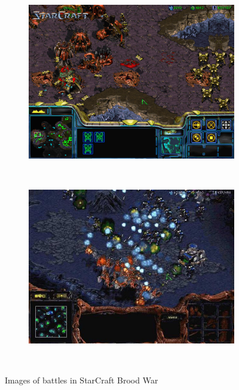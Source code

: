\begin{figure}
        \begin{subfigure}[b]{0.5\textwidth}
                \centering
                \includegraphics[width=\textwidth]{sc1}
        \end{subfigure}%
        ~ %
        \begin{subfigure}[b]{0.5\textwidth}
                \centering
                \includegraphics[width=\textwidth]{sc2}
        \end{subfigure}
        ~ %
        \caption{Images of battles in StarCraft Brood War}\label{fig:animals}
\end{figure}


